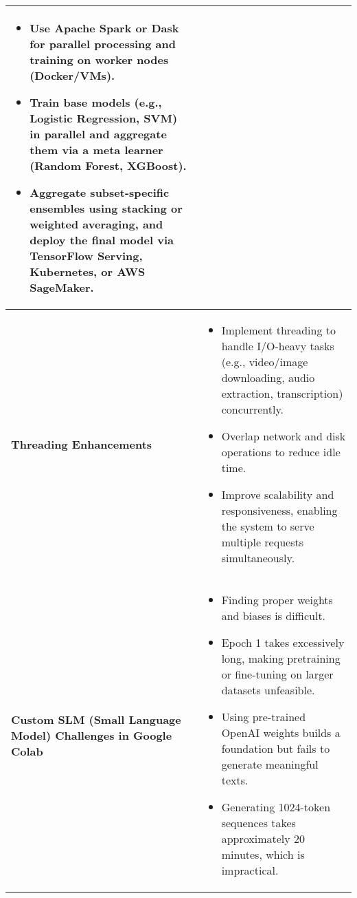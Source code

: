 \begin{table}[H]
\begin{tabularx}{\textwidth}{|>{\raggedright\arraybackslash}p{3cm}|X|}
\begin{itemize}[noitemsep, leftmargin=*, topsep=0pt]
        \item Use Apache Spark or Dask for parallel processing and training on worker nodes (Docker/VMs).
        \item Train base models (e.g., Logistic Regression, SVM) in parallel and aggregate them via a meta learner (Random Forest, XGBoost).
        \item Aggregate subset-specific ensembles using stacking or weighted averaging, and deploy the final model via TensorFlow Serving, Kubernetes, or AWS SageMaker.
    \end{itemize} \\ \hline
    \textbf{Threading Enhancements} & 
    \begin{itemize}[noitemsep, leftmargin=*, topsep=0pt]
        \item Implement threading to handle I/O-heavy tasks (e.g., video/image downloading, audio extraction, transcription) concurrently.
        \item Overlap network and disk operations to reduce idle time.
        \item Improve scalability and responsiveness, enabling the system to serve multiple requests simultaneously.
    \end{itemize} \\ \hline
    \textbf{Custom SLM (Small Language Model) Challenges in Google Colab} & 
    \begin{itemize}[noitemsep, leftmargin=*, topsep=0pt]
        \item Finding proper weights and biases is difficult.
        \item Epoch 1 takes excessively long, making pretraining or fine-tuning on larger datasets unfeasible.
        \item Using pre-trained OpenAI weights builds a foundation but fails to generate meaningful texts.
        \item Generating 1024-token sequences takes approximately 20 minutes, which is impractical.
    \end{itemize} \\ \hline
    \end{tabularx}
\end{table}


\pagebreak
